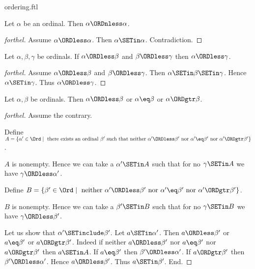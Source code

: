 \documentclass{naproche-library}
\begin{document}
\begin{smodule}[title=The Standard Ordering of the Ordinals]{ordering.ftl}
\begin{proposition}[forthel,id=SET_THEORY_02_6229364135952384]
  Let $\alpha$ be an ordinal.
  Then $\alpha \ORDnless \alpha$.
\end{proposition}
\begin{proof}[forthel]
  Assume $\alpha \ORDless \alpha$.
  Then $\alpha \SETin \alpha$.
  Contradiction.
\end{proof}

\begin{proposition}[forthel,id=SET_THEORY_02_7098683017396224]
  Let $\alpha, \beta, \gamma$ be ordinals.
  If $\alpha \ORDless \beta$ and $\beta \ORDless \gamma$ then $\alpha \ORDless \gamma$.
\end{proposition}
\begin{proof}[forthel]
  Assume $\alpha \ORDless \beta$ and $\beta \ORDless \gamma$.
  Then $\alpha \SETin \beta \SETin \gamma$.
  Hence $\alpha \SETin \gamma$.
  Thus $\alpha \ORDless \gamma$.
\end{proof}

\begin{proposition}[forthel,id=SET_THEORY_02_1718825707896832]
  Let $\alpha, \beta$ be ordinals.
  Then $\alpha \ORDless \beta$ or $\alpha \eq \beta$ or $\alpha \ORDgtr \beta$.
\end{proposition}
\begin{proof}[forthel]
  Assume the contrary.
  
  Define $A = \{ \alpha' \in \Ord \mid\text{ there exists an ordinal }\beta'\text{ such that neither }\alpha' \ORDless \beta'\text{ nor }\alpha' \eq \beta'\text{ nor }\alpha' \ORDgtr \beta' \}$.
  
  $A$ is nonempty.
  Hence we can take a $\alpha' \SETin A$ such that for no $\gamma \SETin A$ we have $\gamma \ORDless \alpha'$.
  
  Define $B = \{ \beta' \in \Ord \mid\text{ neither }\alpha' \ORDless \beta'\text{ nor }\alpha' \eq \beta'\text{ nor }\alpha' \ORDgtr \beta' \}$.
  
  $B$ is nonempty.
  Hence we can take a $\beta' \SETin B$ such that for no $\gamma \SETin B$ we have $\gamma \ORDless \beta'$.

  Let us show that $\alpha' \SETinclude \beta'$.
    Let $a \SETin \alpha'$.
    Then $a \ORDless \beta'$ or $a \eq \beta'$ or $a \ORDgtr \beta'$.
    Indeed if neither $a \ORDless \beta'$ nor $a \eq \beta'$ nor $a \ORDgtr \beta'$ then
    $a \SETin A$.
    If $a \eq \beta'$ then $\beta' \ORDless \alpha'$.
    If $a \ORDgtr \beta'$ then $\beta' \ORDless \alpha'$.
    Hence $a \ORDless \beta'$.
    Thus $a \SETin \beta'$.
  End.


\end{proof}
\end{smodule}
\end{document}
